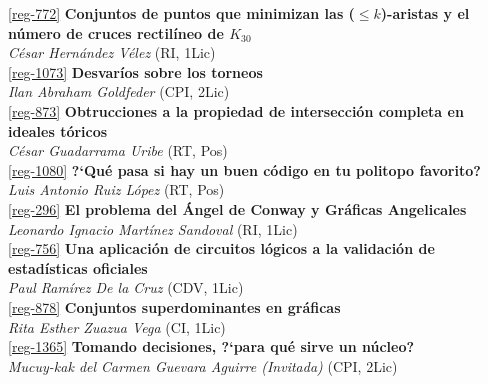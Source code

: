 \begin{multicols}{2}
\raggedcolumns

\noindent  \ref{reg-772}  {\bfseries Conjuntos de puntos que minimizan las ($\leq\!k$)-aristas y el n\'umero de cruces rectil\'ineo de $K_{30}$}\\
{\slshape  C\'esar  Hern\'andez V\'elez} {\footnotesize (RI, 1Lic)}\\

\noindent  \ref{reg-1073}  {\bfseries Desvar\'ios sobre los torneos}\\
{\slshape  Ilan Abraham Goldfeder} {\footnotesize (CPI, 2Lic)}\\

\noindent  \ref{reg-873}  {\bfseries Obtrucciones a la propiedad de intersecci\'on completa en ideales t\'oricos}\\
{\slshape  C\'esar  Guadarrama Uribe} {\footnotesize (RT, Pos)}\\

\noindent  \ref{reg-1080}  {\bfseries ?`Qu\'e pasa si hay un buen c\'odigo en tu politopo favorito?}\\
{\slshape  Luis Antonio Ruiz L\'opez} {\footnotesize (RT, Pos)}\\

\noindent  \ref{reg-296}  {\bfseries El problema del \'Angel de Conway y Gr\'aficas Angelicales}\\
{\slshape  Leonardo Ignacio Mart\'inez Sandoval} {\footnotesize (RI, 1Lic)}\\

\noindent  \ref{reg-756}  {\bfseries Una aplicaci\'on de circuitos l\'ogicos a la validaci\'on de estad\'isticas oficiales}\\
{\slshape  Paul  Ram\'irez De la Cruz} {\footnotesize (CDV, 1Lic)}\\

\noindent  \ref{reg-878}  {\bfseries Conjuntos superdominantes en gr\'aficas}\\
{\slshape  Rita Esther Zuazua Vega} {\footnotesize (CI, 1Lic)}\\

\noindent  \ref{reg-1365}  {\bfseries Tomando decisiones, ?`para qu\'e sirve un n\'ucleo?}\\
{\slshape  Mucuy-kak del Carmen Guevara Aguirre (Invitada)} {\footnotesize (CPI, 2Lic)}\\


\end{multicols}
